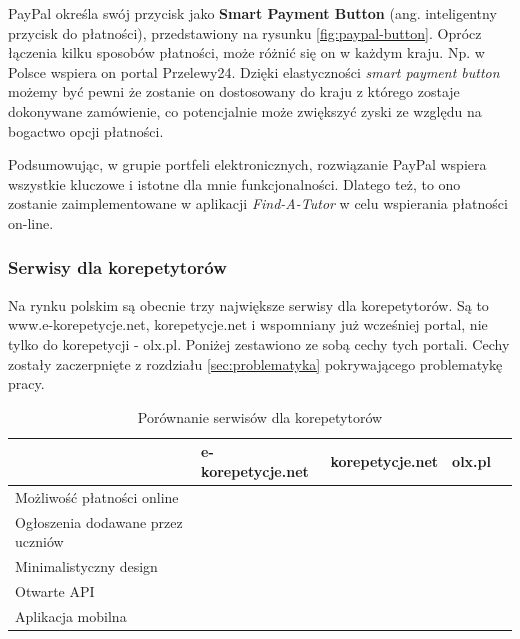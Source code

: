 \documentclass[12pt]{article}
\newcommand{\cmark}{\textcolor{green!80!black}{\ding{51}}}
\newcommand{\xmark}{\textcolor{red}{\ding{55}}}
\numberwithin{figure}{section}
\begin{document}
PayPal określa swój przycisk jako \textbf{Smart Payment Button} (ang. 
inteligentny przycisk do płatności), przedstawiony na rysunku \ref{fig:paypal-button}. Oprócz łączenia kilku sposobów płatności, może różnić się on w każdym kraju. Np. w Polsce wspiera on portal Przelewy24. Dzięki elastyczności \textit{smart payment button} możemy być pewni że zostanie on dostosowany do kraju z którego zostaje dokonywane zamówienie, co potencjalnie może zwiększyć zyski ze względu na bogactwo opcji płatności. 

Podsumowując, w grupie portfeli elektronicznych, rozwiązanie PayPal wspiera wszystkie kluczowe i istotne dla mnie funkcjonalności. Dlatego też, to ono zostanie zaimplementowane w aplikacji \textit{Find-A-Tutor} w celu wspierania płatności on-line.

\subsubsection{Serwisy dla korepetytorów}
Na rynku polskim są obecnie trzy największe serwisy dla korepetytorów. Są to www.e-korepetycje.net, 
korepetycje.net i wspomniany już wcześniej portal, nie tylko do korepetycji - olx.pl. Poniżej zestawiono ze sobą cechy tych portali. Cechy zostały zaczerpnięte z rozdziału \ref{sec:problematyka} pokrywającego problematykę pracy.

\begin{table}[H]
\begin{tabular}{|p{5cm}|c|c|c|c|}
\hline
 & \multicolumn{1}{l|}{e-korepetycje.net} & \multicolumn{1}{l|}{korepetycje.net} & \multicolumn{1}{l|}{olx.pl} \\ \hline
Możliwość płatności online & \xmark & \xmark & \xmark \\ \hline
Ogłoszenia dodawane przez uczniów & \cmark & \xmark & \cmark \\ \hline
Minimalistyczny design & \cmark & \xmark & \xmark \\ \hline
Otwarte API & \xmark & \xmark & \xmark \\ \hline
Aplikacja mobilna & \xmark & \xmark & \cmark \\ \hline
\end{tabular}
\caption{Porównanie serwisów dla korepetytorów}
\label{tab:korepetycje}
\end{table}
\end{document}
